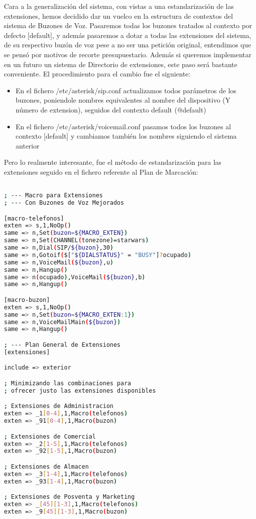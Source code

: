 Cara a la generalización del sistema, con vistas a una estandarización de las extensiones, hemos decidido dar un vuelco en la estructura de contextos del sistema de Buzones de Voz. Pasaremos todas los buzones tratados al contexto por defecto [default], y además pasaremos a dotar a todas las extensiones del sistema, de su respectivo buzón de voz pese a no ser una petición original, entendimos que se pensó por motivos de recorte presupuestario. Además si queremos implementar en un futuro un sistema de Directorio de extensiones, este paso será bastante conveniente. El procedimiento para el cambio fue el siguiente:

\begin{itemize}

\item En el fichero /etc/asterisk/sip.conf actualizamos todos parámetros de los buzones, poniendole nombres equivalentes al nombre del dispositivo (Y número de extension), seguidos del contexto default (@default)
\item En el fichero /etc/asterisk/voicemail.conf pasamos todos los buzones al contexto [default] y cambiamos también los nombres siguiendo el sistema anterior

\end{itemize}

Pero lo realmente interesante, fue el método de estandarización para las extensiones seguido en el fichero referente al Plan de Marcación:

\begin{lstlisting}[language=bash,title={/etc/asterisk/extensions.conf}]

; --- Macro para Extensiones
; --- Con Buzones de Voz Mejorados

[macro-telefonos]
exten => s,1,NoOp()
same => n,Set(buzon=${MACRO_EXTEN})
same => n,Set(CHANNEL(tonezone)=starwars)
same => n,Dial(SIP/${buzon},30)
same => n,Gotoif($["${DIALSTATUS}" = "BUSY"]?ocupado)
same => n,VoiceMail(${buzon},u)
same => n,Hangup()
same => n(ocupado),VoiceMail(${buzon},b)
same => n,Hangup()

[macro-buzon]
exten => s,1,NoOp()
same => n,Set(buzon=${MACRO_EXTEN:1})
same => n,VoiceMailMain(${buzon})
same => n,Hangup()

; --- Plan General de Extensiones
[extensiones]

include => exterior

; Minimizando las combinaciones para
; ofrecer justo las extensiones disponibles

; Extensiones de Administracion
exten => _1[0-4],1,Macro(telefonos)
exten => _91[0-4],1,Macro(buzon)

; Extensiones de Comercial
exten => _2[1-5],1,Macro(telefonos)
exten => _92[1-5],1,Macro(buzon)

; Extensiones de Almacen
exten => _3[1-4],1,Macro(telefonos)
exten => _93[1-4],1,Macro(buzon)

; Extensiones de Posventa y Marketing
exten => _[45][1-3],1,Macro(telefonos)
exten => _9[45][1-3],1,Macro(buzon)

\end{lstlisting}

